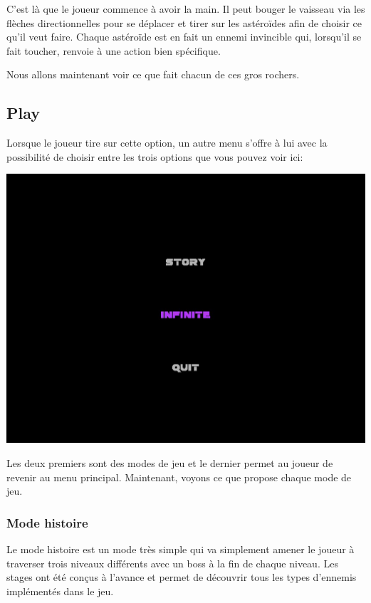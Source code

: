 \documentclass{article}
\begin{document}
C'est là que le joueur commence à avoir la main. Il peut bouger le vaisseau via
les flèches directionnelles pour se déplacer et tirer sur les astéroïdes afin de
choisir ce qu'il veut faire. Chaque astéroïde est en fait un ennemi invincible
qui, lorsqu'il se fait toucher, renvoie à une action bien spécifique.

Nous allons maintenant voir ce que fait chacun de ces gros rochers.

\subsection{Play}

Lorsque le joueur tire sur cette option, un autre menu s'offre à lui avec la
possibilité de choisir entre les trois options que vous pouvez voir ici:

\begin{center}
\includegraphics[scale=0.5]{images/sousmenu.jpg}
\end{center}

Les deux premiers sont des modes de jeu et le dernier permet au joueur de
revenir au menu principal. Maintenant, voyons ce que propose chaque mode de jeu.

\subsubsection{Mode histoire}

Le mode histoire est un mode très simple qui va simplement amener le joueur à traverser
trois niveaux différents avec un boss à la fin de chaque niveau. Les stages ont
été conçus à l'avance et permet de découvrir tous les types d'ennemis
implémentés dans le jeu.
\end{document}
